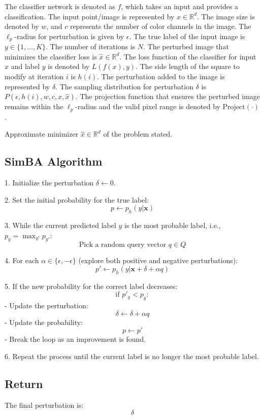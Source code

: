 The classifier network is denoted as $f$, which takes an input and provides a classification. The input point/image is represented by $x \in \mathbb{R}^d$. The image size is denoted by $w$, and $c$ represents the number of color channels in the image. The $\ell_p$-radius for perturbation is given by $\epsilon$. The true label of the input image is $y \in \{1, \ldots, K\}$. The number of iterations is $N$. The perturbed image that minimizes the classifier loss is $\hat{x} \in \mathbb{R}^d$. The loss function of the classifier for input $x$ and label $y$ is denoted by $L(f(x), y)$. The side length of the square to modify at iteration $i$ is $h(i)$. The perturbation added to the image is represented by $\delta$. The sampling distribution for perturbation $\delta$ is $P(\epsilon, h(i), w, c, x, \hat{x})$. The projection function that ensures the perturbed image remains within the $\ell_p$-radius and the valid pixel range is denoted by $\text{Project}(\cdot)$.

Approximate minimizer $\hat{x} \in \mathbb{R}^d$ of the problem stated.

\subsection*{SimBA Algorithm}

1. Initialize the perturbation $\delta \leftarrow 0$.

2. Set the initial probability for the true label:
\[
p \leftarrow p_h(y | \mathbf{x})
\]

3. While the current predicted label $y$ is the most probable label, i.e., $p_y = \max_{y'} p_{y'}$:
\[
\text{Pick a random query vector } q \in Q
\]

4. For each $\alpha \in \{\epsilon, -\epsilon\}$ (explore both positive and negative perturbations):
\[
p' \leftarrow p_h(y | \mathbf{x} + \delta + \alpha q)
\]

5. If the new probability for the correct label decreases:
\[
\text{if } p'_y < p_y:
\]
    - Update the perturbation:
    \[
    \delta \leftarrow \delta + \alpha q
    \]
    - Update the probability:
    \[
    p \leftarrow p'
    \]
    - Break the loop as an improvement is found.

6. Repeat the process until the current label is no longer the most probable label.

\subsection*{Return}
The final perturbation is:
\[
\delta
\]


